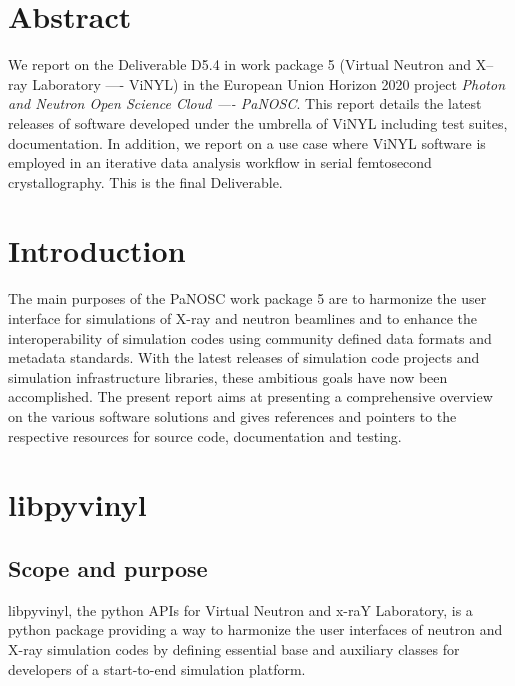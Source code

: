\documentclass[11pt, a4paper]{article}
\begin{document}
\newpage
{}
\newpage
\tableofcontents
\newpage

\section{Abstract}
We report on the Deliverable D5.4 in work package 5 (Virtual Neutron and X--ray
Laboratory ---- ViNYL) in the European Union Horizon 2020 project \emph{Photon
  and Neutron Open Science Cloud ---- PaNOSC}. 
This report details the latest releases of  software developed under the umbrella of
ViNYL including test suites, documentation. In addition, we report on a use case
where ViNYL software is employed in an iterative data analysis workflow in serial
femtosecond crystallography. This is the final Deliverable.

\section{Introduction}

The main purposes of the PaNOSC work package 5 are to
harmonize the user interface for simulations of X-ray and neutron beamlines and
to enhance the interoperability of simulation codes using community
defined data formats and metadata standards. With the latest releases of
simulation code projects and simulation infrastructure libraries, these
ambitious
goals have now been accomplished. The present report aims at presenting a
comprehensive
overview on the various software solutions and gives references and pointers to
the respective resources for source code,
documentation and testing.

\section{libpyvinyl}
\label{sec:libpyvinyl}


\subsection{Scope and purpose}
\label{sec:lpv_scope}
libpyvinyl, the python APIs for Virtual Neutron and x-raY Laboratory, is a python package providing a way to harmonize the user interfaces of neutron and X-ray simulation codes by defining essential base and auxiliary classes for developers of a start-to-end simulation platform. 
\end{document}
